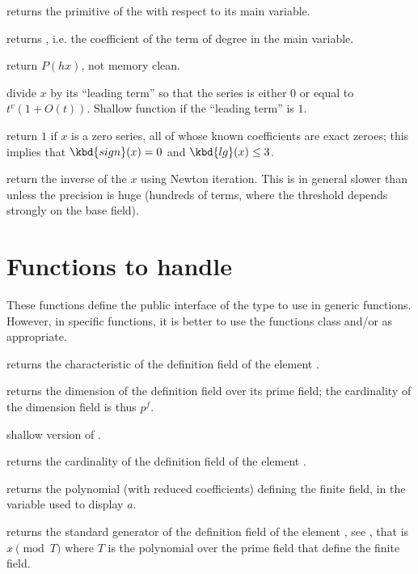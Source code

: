  returns the primitive of the  
with respect to its main variable.

 returns , i.e.
the coefficient of the term of degree  in the main variable.

 return $P(h x)$, not memory clean.

 divide $x$ by its ``leading term'' so that
the series is either $0$ or equal to $t^v(1+O(t))$. Shallow function if the
``leading term'' is $1$.

 return $1$ if $x$ is a zero series, all
of whose known coefficients are exact zeroes; this implies that
$\kbd{sign}(x) = 0$ and $\kbd{lg}(x) \leq 3$.

 return the inverse of the  $x$ using
Newton iteration. This is in general slower than  unless the
precision is huge (hundreds of terms, where the threshold depends strongly
on the base field).

\section{Functions to handle }
These functions define the public interface of the  type to use in
generic functions.  However, in specific functions, it is better to use the
functions class  and/or  as appropriate.

 returns the characteristic of the definition field of the
 element .

 returns the dimension of the definition field over
its prime field; the cardinality of the dimension field is thus $p^f$.

 shallow version of .

 returns the cardinality of the definition field of the
 element .

 returns the polynomial (with reduced 
coefficients) defining the finite field, in the variable used to display $a$.

 returns the standard generator of the definition field
of the  element , see , that is $x\pmod{T}$ where
$T$ is the polynomial over the prime field that define the finite field.

